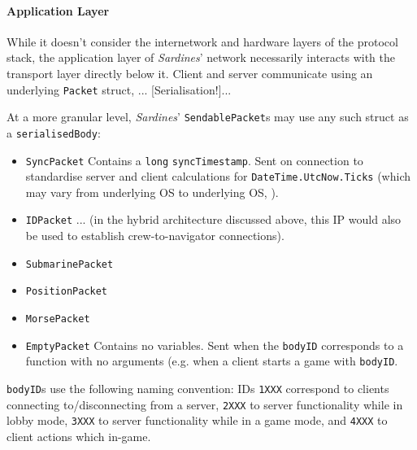 \documentclass[a4paper, 10pt]{article}
\begin{document}
\begin{flushleft}
\paragraph{Application Layer} 

While it doesn't consider the internetwork and hardware layers of the protocol stack, the application layer of \textit{Sardines}' network necessarily interacts with the transport layer directly below it. Client and server communicate using an underlying \texttt{Packet} struct, ...
[Serialisation!]...

\vspace{5pt}\noindent
At a more granular level, \textit{Sardines}' \texttt{SendablePacket}s may use any such struct as a \texttt{serialisedBody}:
\begin{itemize}[noitemsep]
\item \texttt{SyncPacket} Contains a \texttt{long} \texttt{syncTimestamp}. Sent on connection to standardise server and client calculations for \texttt{DateTime.UtcNow.Ticks} (which may vary from underlying OS to underlying OS, \citealp{msftUTC}).
\item \texttt{IDPacket} ... (in the hybrid architecture discussed above, this IP would also be used to establish crew-to-navigator connections).
\item \texttt{SubmarinePacket} 
\item \texttt{PositionPacket}
\item \texttt{MorsePacket}
\item \texttt{EmptyPacket} Contains no variables. Sent when the \texttt{bodyID} corresponds to a function with no arguments (e.g. when a client starts a game with \texttt{bodyID}.
\end{itemize}
\texttt{bodyID}s use the following naming convention: IDs \texttt{1XXX} correspond to clients connecting to/disconnecting from a server, \texttt{2XXX} to server functionality while in lobby mode, \texttt{3XXX} to server functionality while in a game mode, and \texttt{4XXX} to client actions which in-game.


\end{flushleft}
\end{document}
